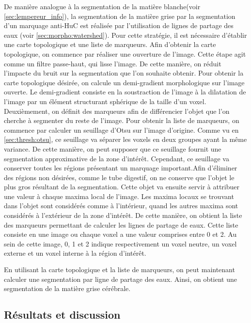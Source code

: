 \documentclass[\main/main.tex]{subfiles}
\begin{document}
De manière analogue à la segmentation de la matière blanche(voir \ref{sec:lempereur_info}), la segmentation de la matière grise par la segmentation d'un marquage anti-HuC est réalisée par l'utilisation de lignes de partage des eaux
(voir \ref{sec:morpho:watershed}). Pour cette stratégie, il est nécessaire d'établir une carte topologique et une liste de marqueurs.
%
Afin d'obtenir la carte topologique, on commence par réaliser une ouverture de l'image. Cette étape agit comme un filtre passe-haut,
qui lisse l'image. De cette manière, on réduit l'impacte du bruit sur la segmentation que l'on souhaite obtenir. Pour obtenir la carte topologique désirée, on calcule un demi-gradient morphologique sur l'image ouverte. Le demi-gradient consiste en la soustraction de l'image à la dilatation de l'image par un élément structurant sphérique de la taille d'un voxel.
Deuxièmement, on définit des marqueurs afin de différencier l'objet que l'on cherche à segmenter du reste de l'image. Pour obtenir la liste de marqueurs, on commence par calculer un seuillage d'Otsu sur l'image d'origine. Comme vu en \ref{sec:thresh:otsu}, ce seuillage va séparer les voxels en deux groupes ayant la même variance. De cette manière, on peut supposer que ce seuillage fournit une segmentation approximative de la zone d'intérêt. Cependant, ce seuillage va conserver toutes les régions présentant un marquage important.Afin d'éliminer des régions non désirées, comme le tube digestif, on ne conserve que l'objet le plus gros résultant de la segmentation.
%
Cette objet va ensuite servir à attribuer une valeur à chaque maxima local de l'image. Les maxima locaux se trouvant dans l'objet sont considérés comme à l'intérieur, quand les autres maxima sont considérés à l'extérieur de la zone d'intérêt. De cette manière, on obtient la liste des marqueurs permettant de calculer les lignes de partage de eaux. Cette liste consiste en une image ou chaque voxel a une valeur comprises entre 0 et 2. Au sein de cette image, 0, 1 et 2 indique respectivement un voxel neutre, un voxel externe et un voxel interne à la région d'intérêt. 

%
En utilisant la carte topologique et la liste de marqueurs, on peut maintenant calculer une segmentation par ligne de partage des eaux. Ainsi, on obtient une segmentation de la matière grise cérébrale.
    
    \subsection{Résultats et discussion}
    
\end{document}
